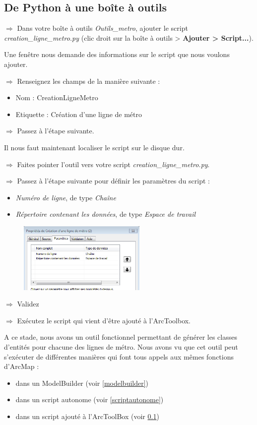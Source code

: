 \documentclass[11pt]{article}
\newcommand{\action}{$\Rightarrow$ }
\begin{document}
\subsection{De Python à une boîte à outils}
\label{scripttoolbox}
\action Dans votre boîte à outils \textit{Outils\_metro}, ajouter le script \textit{creation\_ligne\_metro.py} (clic droit sur la boîte à outils > \textbf{Ajouter > Script...}).

Une fenêtre nous demande des informations sur le script que nous voulons ajouter.

\action Renseignez les champs de la manière suivante : 
\begin{itemize}
	\item Nom : CreationLigneMetro
	\item Etiquette : Création d'une ligne de métro
\end{itemize}

\action Passez à l'étape suivante.

Il nous faut maintenant localiser le script sur le disque dur. 

\action Faites pointer l'outil vers votre script \textit{creation\_ligne\_metro.py}.

\action Passez à l'étape suivante pour définir les paramètres du script :
\begin{itemize}
	\item \textit{Numéro de ligne}, de type \textit{Chaîne}
	\item \textit{Répertoire contenant les données}, de type \textit{Espace de travail}
\end{itemize}

\begin{figure}[H]
	\center \includegraphics[width=0.55\textwidth]{img/td3/script_arcpy_param.png} \\
\end{figure}

\action Validez

\action Exécutez le script qui vient d'être ajouté à l'ArcToolbox.

A ce stade, nous avons un outil fonctionnel permettant de générer les classes d'entités pour chacune des lignes de métro. Nous avons vu que cet outil peut s'exécuter de différentes manières qui font tous appels aux mêmes fonctions d'ArcMap :
\begin{itemize}
	\item dans un ModelBuilder (voir \ref{modelbuilder})
	\item dans un script autonome (voir \ref{scriptautonome})
	\item dans un script ajouté à l'ArcToolBox (voir \ref{scripttoolbox})
\end{itemize}
\end{document}
